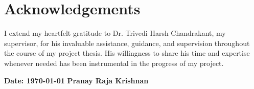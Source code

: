 \chapter*{Acknowledgements}


I extend my heartfelt gratitude to Dr. Trivedi Harsh Chandrakant, my supervisor, for his invaluable assistance, guidance, and supervision throughout the course of my project thesis. His willingness to share his time and expertise whenever needed has been instrumental in the progress of my project.


\vspace*{6cm}
\textbf{Date: \today}
\hfill{}
\textbf{Pranay Raja Krishnan}
